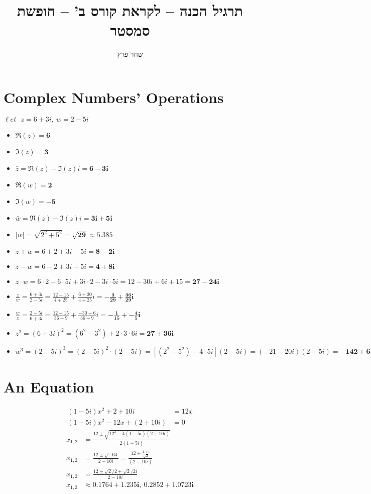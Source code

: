 \documentclass[]{article}
\title{תרגיל הכנה – לקראת קורס ב' – חופשת סמסטר}
\author{שחר פרץ}
\newcommand\set   {\ell et \text{ }}
\newcommand\sen   {\selectlanguage{english}}
\begin{document}
	\maketitle
	\sen
	\section{Complex Numbers' Operations}
	$\set z = 6 + 3i, \ w = 2-5i$
	\begin{itemize}
		\item $\Re(z) = \mathbf{6}$
		\item $\Im(z) = \mathbf{3}$
		\item $\bar z = \Re(z)-  \Im(z)i = \mathbf{6 - 3i} $
		\item $\Re(w) = \mathbf{2}$
		\item $\Im(w) = \mathbf{-5}$
		\item $\bar w = \Re(z) - \Im(z)i = \mathbf{3i + 5i}$
		\item $|w| = \sqrt{2^2 + 5^2} = \mathbf{\sqrt{29}} \approx 5.385$
		\item $z + w = 6 + 2 + 3i - 5i = \mathbf{8 - 2i}$
		\item $z - w = 6 - 2 + 3i + 5i = \mathbf{4 + 8i}$
		\item $z \cdot w = 6 \cdot 2 - 6 \cdot 5i + 3i \cdot 2 - 3i \cdot 5i = 12 - 30i + 6i + 15 = \mathbf{27 - 24i}$
		\item $\frac{z}{w} = \frac{6 + 3i}{2 - 5i} = \frac{12 - 15}{4 + 25} + \frac{6 + 30}{4 + 25}i = \mathbf{-\frac{3}{29} + \frac{36}{29}i}$
		\item $\frac{w}{z} = \frac{2 - 5i}{6 + 3i} = \frac{12 - 15}{36 + 9} + \frac{- 30 - 6}{36 + 9}i = \mathbf{-\frac{1}{15} + -\frac{4}{5}i} $
		\item $z^2 = (6 + 3i)^2 = (6^2 - 3^2) + 2 \cdot 3 \cdot 6 i = \mathbf{27 + 36i}$
		\item $w^3 = (2 - 5i)^3 = (2 - 5i)^2 \cdot (2 - 5i) = [(2^2 - 5^2) - 4 \cdot 5i](2 - 5i) = (-21 - 20i)(2 - 5i) = \mathbf{-142 + 65i} $
	\end{itemize}
	\section{An Equation}
	\setlength{\abovedisplayskip}{2pt}
	\setlength{\belowdisplayskip}{2pt}
	\setlength{\abovedisplayshortskip}{2pt}
	\setlength{\belowdisplayshortskip}{2pt}
	\begin{align}
		(1 - 5i)x^2 + 2 + 10i &= 12x \\
		(1 - 5i)x^2 - 12x + (2 + 10i) &= 0
	\end{align}
	\begin{align}
		x_{1, 2} &= \frac{12 \pm \sqrt{12^2 - 4(1 - 5i)(2 + 10i)}}{2(1 - 5i)} \\
		x_{1, 2} &= \frac{12 \pm \sqrt{-64}}{2 - 10i} = \frac{12 \mp \frac{1 + i}{\sqrt2}}{(2 - 10i)} \\
		x_{1, 2} &= \frac{12 \pm \sqrt2 / 2 + \sqrt2 / 2i}{2 - 10i} \\
		x_{1, 2} &\approx \mathbf{0.1764 + 1.235i, \ 0.2852 + 1.0723i}
	\end{align}
\end{document}
